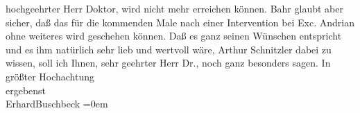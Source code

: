 \begin{ledgroupsized}[t]{13cm}
               hochgeehrter Herr Doktor, wird nicht mehr erreichen können. Bahr glaubt aber sicher, daß das für die kommenden Male nach
               einer Intervention bei Exc. Andrian ohne
               weiteres wird geschehen können. Daß es ganz seinen Wünschen entspricht und es ihm
               natürlich sehr lieb \introOben{}und wertvoll\introOben{} wäre, Arthur Schnitzler
               dabei zu wissen, soll ich Ihnen, sehr geehrter Herr Dr., noch ganz besonders
               sagen.\pend
           \pstart
           In größter Hochachtung{\\[\baselineskip]}ergebenst{\\[\baselineskip]}\spacefill\mbox{ErhardBuschbeck}\pend
           \leftskip=0em{}
         
         \endnumbering{}\end{ledgroupsized}  \newcommand{\dateiname}{L02305}\newcommand{\titel}{Erhard Buschbeck an Arthur Schnitzler, 24. 9. 1918}\newcommand{\editorInnen}{ Martin Anton Müller und Gerd-Hermann Susen}
      